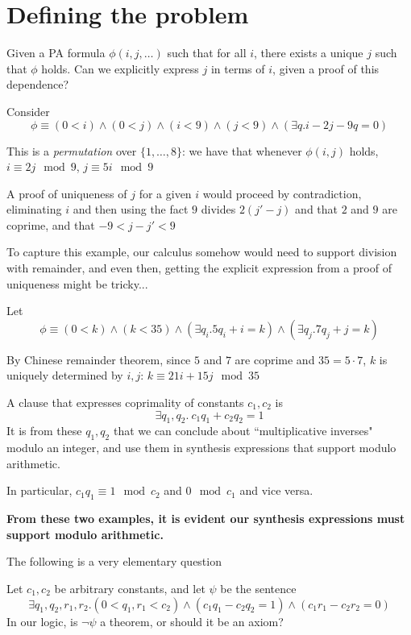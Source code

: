 \documentclass{article}
\begin{document}
\section{Defining the problem}

\begin{question}[Adwait]
Given a PA formula $\phi(i, j, \dots)$ such that for all $i$, there exists a unique $j$ such that $\phi$ holds. Can we explicitly express $j$ in terms of $i$, given a proof of this dependence?
\end{question}

\begin{example}
Consider $$\phi \equiv (0 < i) \land (0 < j) \land (i < 9) \land (j < 9) \land (\exists q. i - 2j -9q = 0)$$
\end{example}
This is a \emph{permutation} over $\{1, \dots, 8\}$: we have that whenever $\phi(i, j)$ holds, $i \equiv 2j \mod 9$, $j \equiv 5i \mod 9$

A proof of uniqueness of $j$ for a given $i$ would proceed by contradiction, eliminating $i$ and then using the fact $9$ divides $2(j' - j)$ and that $2$ and $9$ are coprime, and that $-9 <  j - j' < 9$ 

To capture this example, our calculus somehow would need to support division with remainder, and even then, getting the explicit expression from a proof of uniqueness might be tricky...

\begin{example}
Let
$$
\phi \equiv (0 < k) \land (k < 35) \land (\exists q_i. 5q_i + i = k) \land (\exists q_j . 7q_j + j = k)
$$
\end{example}
By Chinese remainder theorem, since $5$ and $7$ are coprime and $35 = 5 \cdot 7$, $k$ is uniquely determined by $i, j$: $k \equiv 21i + 15j \mod 35$

A clause that expresses coprimality of constants $c_1, c_2$ is 
$$
\exists q_1, q_2 . ~c_1q_1 + c_2 q_2 = 1
$$
It is from these $q_1, q_2$ that we can conclude about ``multiplicative inverses" modulo an integer, and use them in synthesis expressions that support modulo arithmetic.

In particular, $c_1 q_1 \equiv 1 \mod c_2$ and $0 \mod c_1$ and vice versa.

\textbf{From these two examples, it is evident our synthesis expressions must support modulo arithmetic.}

The following is a very elementary question
\begin{question}[Coprimality]
Let $c_1, c_2$ be arbitrary constants, and let $\psi$ be the sentence
$$
\exists q_1, q_2, r_1, r_2 .(0 < q_1, r_1 < c_2) \land (c_1q_1 - c_2q_2 = 1) \land (c_1r_1 - c_2r_2 = 0)
$$
In our logic, is $\neg \psi$ a theorem, or should it be an axiom?
\end{question}
\end{document}
